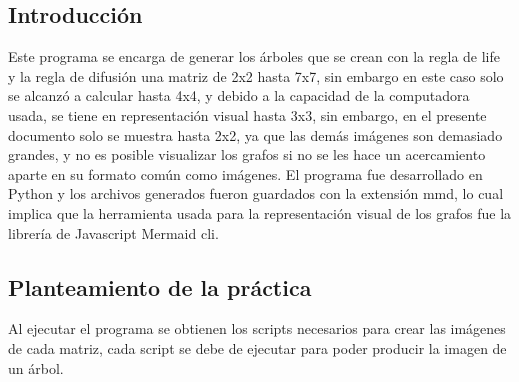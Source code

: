 \subsection{Introducción}
	Este programa se encarga de generar los árboles que se crean con la regla de life y la regla de difusión una matriz de 2x2 hasta 7x7, sin embargo en este caso solo se alcanzó a calcular hasta 4x4, y debido a la capacidad de la computadora usada, se tiene en representación visual hasta 3x3, sin embargo, en el presente documento solo se muestra hasta 2x2, ya que las demás imágenes son demasiado grandes, y no es posible visualizar los grafos si no se les hace un acercamiento aparte en su formato común como imágenes. El programa fue desarrollado en Python y los archivos generados fueron guardados con la extensión mmd, lo cual implica que la herramienta usada para la representación visual de los grafos fue la librería de Javascript Mermaid cli.

\subsection{Planteamiento de la práctica}
	Al ejecutar el programa se obtienen los scripts necesarios para crear las imágenes de cada matriz, cada script se debe de ejecutar para poder producir la imagen de un árbol.